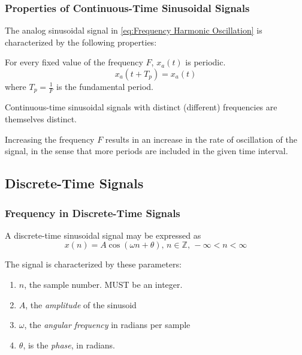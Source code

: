 \subsubsection{Properties of Continuous-Time Sinusoidal Signals}\label{subsubsec:Properties Continuous-Time Sinusoids}
The analog sinusoidal signal in \cref{eq:Frequency Harmonic Oscillation} is characterized by the following properties:
\begin{propertylist}
\item For every fixed value of the frequency $F$, $x_{a}(t)$ is periodic.
  \begin{equation*}
    x_{a}(t+T_{p}) = x_{a}(t)
  \end{equation*}
  where $T_{p} = \frac{1}{F}$ is the fundamental period.
\item Continuous-time sinusoidal signals with distinct (different) frequencies are themselves distinct.
\item Increasing the frequency $F$ results in an increase in the rate of oscillation of the signal, in the sense that more periods are included in the given time interval.
\end{propertylist}

\subsection{Discrete-Time Signals}\label{subsec:Discrete-Time Signals}
\subsubsection{Frequency in Discrete-Time Signals}\label{subsubsec:Frequency in Discrete-Time Signals}
A discrete-time sinusoidal signal may be expressed as
\begin{equation}\label{eq:Discrete Time Sinusoid}
  x(n) = A \cos \left( \omega n + \theta \right) \text{, } n \in \mathbb{Z} \text{, } -\infty < n < \infty
\end{equation}

The signal is characterized by these parameters:
\begin{enumerate}[noitemsep]
\item $n$, the sample number. MUST be an integer.
\item $A$, the \emph{amplitude} of the sinusoid
\item $\omega$, the \emph{angular frequency} in radians per sample
\item $\theta$, is the \emph{phase}, in radians.
\end{enumerate}

